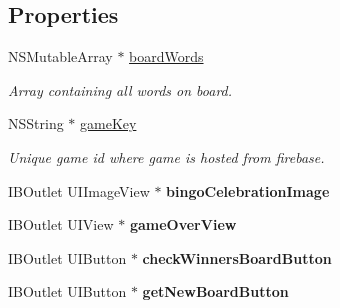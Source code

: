 \subsection*{Properties}
\begin{DoxyCompactItemize}
\item 
\hypertarget{interface_bingo_board_view_controller_a273a683300c3e62e7d67eb59a6e7980b}{N\+S\+Mutable\+Array $\ast$ \hyperlink{interface_bingo_board_view_controller_a273a683300c3e62e7d67eb59a6e7980b}{board\+Words}}\label{interface_bingo_board_view_controller_a273a683300c3e62e7d67eb59a6e7980b}

\begin{DoxyCompactList}\small\item\em Array containing all words on board. \end{DoxyCompactList}\item 
\hypertarget{interface_bingo_board_view_controller_af8b4daa9486d0eb72086a86f65829cdb}{N\+S\+String $\ast$ \hyperlink{interface_bingo_board_view_controller_af8b4daa9486d0eb72086a86f65829cdb}{game\+Key}}\label{interface_bingo_board_view_controller_af8b4daa9486d0eb72086a86f65829cdb}

\begin{DoxyCompactList}\small\item\em Unique game id where game is hosted from firebase. \end{DoxyCompactList}\item 
\hypertarget{interface_bingo_board_view_controller_a7649ecf436718d0c80bd55cec4957784}{I\+B\+Outlet U\+I\+Image\+View $\ast$ {\bfseries bingo\+Celebration\+Image}}\label{interface_bingo_board_view_controller_a7649ecf436718d0c80bd55cec4957784}

\item 
\hypertarget{interface_bingo_board_view_controller_a4ac2e59031229636d0326cd7f40e2ffc}{I\+B\+Outlet U\+I\+View $\ast$ {\bfseries game\+Over\+View}}\label{interface_bingo_board_view_controller_a4ac2e59031229636d0326cd7f40e2ffc}

\item 
\hypertarget{interface_bingo_board_view_controller_a74f72a80d8e332113607f58e61c7454b}{I\+B\+Outlet U\+I\+Button $\ast$ {\bfseries check\+Winners\+Board\+Button}}\label{interface_bingo_board_view_controller_a74f72a80d8e332113607f58e61c7454b}

\item 
\hypertarget{interface_bingo_board_view_controller_a5bc9cc226ea6a175bc92cb210be4c35a}{I\+B\+Outlet U\+I\+Button $\ast$ {\bfseries get\+New\+Board\+Button}}\label{interface_bingo_board_view_controller_a5bc9cc226ea6a175bc92cb210be4c35a}


\end{DoxyCompactItemize}
